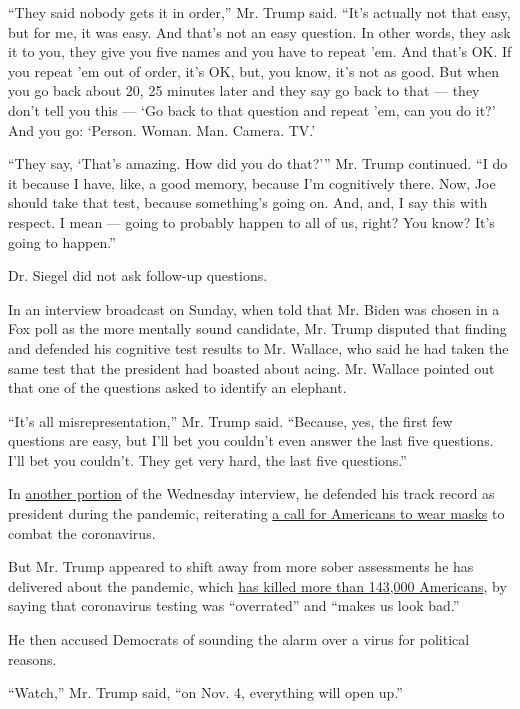 ``They said nobody gets it in order,'' Mr. Trump said. ``It's actually
not that easy, but for me, it was easy. And that's not an easy question.
In other words, they ask it to you, they give you five names and you
have to repeat 'em. And that's OK. If you repeat 'em out of order, it's
OK, but, you know, it's not as good. But when you go back about 20, 25
minutes later and they say go back to that --- they don't tell you this
--- `Go back to that question and repeat 'em, can you do it?' And you
go: `Person. Woman. Man. Camera. TV.'

``They say, `That's amazing. How did you do that?''' Mr. Trump
continued. ``I do it because I have, like, a good memory, because I'm
cognitively there. Now, Joe should take that test, because something's
going on. And, and, I say this with respect. I mean --- going to
probably happen to all of us, right? You know? It's going to happen.''

Dr. Siegel did not ask follow-up questions.

In an interview broadcast on Sunday, when told that Mr. Biden was chosen
in a Fox poll as the more mentally sound candidate, Mr. Trump disputed
that finding and defended his cognitive test results to Mr. Wallace, who
said he had taken the same test that the president had boasted about
acing. Mr. Wallace pointed out that one of the questions asked to
identify an elephant.

``It's all misrepresentation,'' Mr. Trump said. ``Because, yes, the
first few questions are easy, but I'll bet you couldn't even answer the
last five questions. I'll bet you couldn't. They get very hard, the last
five questions.''

In \href{https://www.youtube.com/watch?v=3akO234sQi0}{another portion}
of the Wednesday interview, he defended his track record as president
during the pandemic, reiterating
\href{https://www.nytimes.com/2020/07/21/us/politics/trump-coronavirus-masks.html}{a
call for Americans to wear masks} to combat the coronavirus.

But Mr. Trump appeared to shift away from more sober assessments he has
delivered about the pandemic, which
\href{https://www.nytimes.com/interactive/2020/us/coronavirus-us-cases.html}{has
killed more than 143,000 Americans}, by saying that coronavirus testing
was ``overrated'' and ``makes us look bad.''

He then accused Democrats of sounding the alarm over a virus for
political reasons.

``Watch,'' Mr. Trump said, ``on Nov. 4, everything will open up.''

